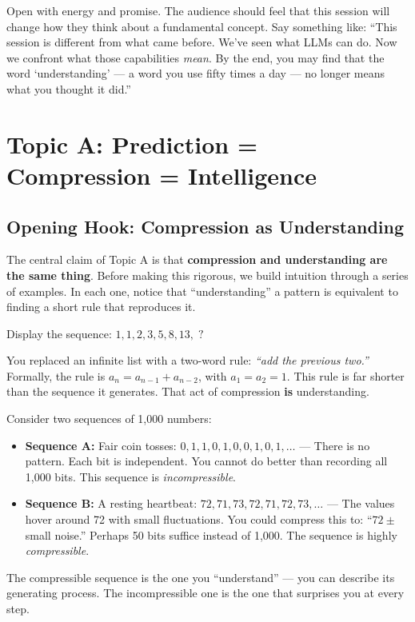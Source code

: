 \documentclass[11pt, a4paper]{article}
\begin{document}
\begin{speakingnote}
Open with energy and promise. The audience should feel that this session
will change how they think about a fundamental concept. Say something like:
``This session is different from what came before. We've seen what LLMs can
do. Now we confront what those capabilities \emph{mean}. By the end, you
may find that the word `understanding' --- a word you use fifty times a
day --- no longer means what you thought it did.''
\end{speakingnote}

\section{Topic A: Prediction = Compression = Intelligence}

\subsection{Opening Hook: Compression as Understanding}

The central claim of Topic A is that \textbf{compression and understanding
are the same thing}. Before making this rigorous, we build intuition through
a series of examples. In each one, notice that ``understanding'' a pattern
is equivalent to finding a short rule that reproduces it.

\begin{example}[title={Example 1: The Fibonacci Sequence}]
Display the sequence: $1, 1, 2, 3, 5, 8, 13, \;?$

You replaced an infinite list with a two-word rule: \emph{``add the
previous two.''} Formally, the rule is $a_n = a_{n-1} + a_{n-2}$, with
$a_1 = a_2 = 1$. This rule is far shorter than the sequence it generates.
That act of compression \textbf{is} understanding.
\end{example}

\begin{example}[title={Example 2: A Coin Toss vs.\ a Heartbeat}]
Consider two sequences of 1,000 numbers:
\begin{itemize}[leftmargin=2em]
  \item \textbf{Sequence A:} Fair coin tosses: $0, 1, 1, 0, 1, 0, 0, 1, 0, 1, \ldots$ --- There is no pattern. Each bit is independent. You cannot do better than recording all 1,000 bits. This sequence is \emph{incompressible}.
  \item \textbf{Sequence B:} A resting heartbeat: $72, 71, 73, 72, 71, 72, 73, \ldots$ --- The values hover around 72 with small fluctuations. You could compress this to: ``$72 \pm$ small noise.'' Perhaps 50 bits suffice instead of 1,000. The sequence is highly \emph{compressible}.
\end{itemize}
The compressible sequence is the one you ``understand'' --- you can describe its generating process. The incompressible one is the one that surprises you at every step.
\end{example}
\end{document}
